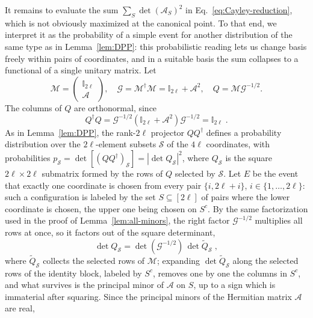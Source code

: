 \documentclass[prx,twocolumn,superscriptaddress,aps,10pt, frontmatterverbose, reprint,footinbib,longbibliography=true]{revtex4-2}
\begin{document}
It remains to evaluate the sum $\sum_S\det(\mathcal{A}_S)^2$ in Eq.~\eqref{eq:Cayley-reduction}, which is not obviously maximized at the canonical point. To that end, we interpret it as the probability of a simple event for another distribution of the same type as in Lemma~\ref{lem:DPP}: this probabilistic reading lets us change basis freely within pairs of coordinates, and in a suitable basis the sum collapses to a functional of a single unitary matrix. Let
\begin{equation}\mathcal{M}=\begin{pmatrix}\mathbb{I}_{2\ell}\\ \mathcal{A}\end{pmatrix},\quad \mathcal{G}=\mathcal{M}^\dagger \mathcal{M}=\mathbb{I}_{2\ell}+\mathcal{A}^2,\quad Q=\mathcal{M}\mathcal{G}^{-1/2}.
\end{equation}
The columns of $Q$ are orthonormal, since
\begin{equation}
Q^\dagger Q=\mathcal{G}^{-1/2}\left(\mathbb{I}_{2\ell}+\mathcal{A}^2\right)\mathcal{G}^{-1/2}=\mathbb{I}_{2\ell}\;.
\end{equation}
As in Lemma~\ref{lem:DPP}, the rank-$2\ell$ projector $QQ^\dagger$ defines a probability distribution over the $2\ell$-element subsets $\mathcal{S}$ of the $4\ell$ coordinates, with probabilities $p_{\mathcal{S}}=\det[(QQ^\dagger)_{\mathcal{S}}]=|\det Q_{\mathcal{S}}|^2$, where $Q_{\mathcal{S}}$ is the square $2\ell\times2\ell$ submatrix formed by the rows of $Q$ selected by $\mathcal{S}$. Let $E$ be the event that exactly one coordinate is chosen from every pair $\{i,2\ell+i\}$, $i\in\{1,\dots,2\ell\}$: such a configuration is labeled by the set $S\subseteq[2\ell]$ of pairs where the lower coordinate is chosen, the upper one being chosen on $S^c$. By the same factorization used in the proof of Lemma~\ref{lem:all-minors}, the right factor $\mathcal{G}^{-1/2}$ multiplies all rows at once, so it factors out of the square determinant,
\begin{equation}
\det Q_{\mathcal{S}}=\det(\mathcal{G}^{-1/2})\,\det\widetilde Q_{\mathcal{S}}\;,
\end{equation}
where $\widetilde Q_{\mathcal{S}}$ collects the selected rows of $\mathcal{M}$; expanding $\det\widetilde Q_{\mathcal{S}}$ along the selected rows of the identity block, labeled by $S^c$, removes one by one the columns in $S^c$, and what survives is the principal minor of $\mathcal{A}$ on $S$, up to a sign which is immaterial after squaring. Since the principal minors of the Hermitian matrix $\mathcal{A}$ are real,
\end{document}
